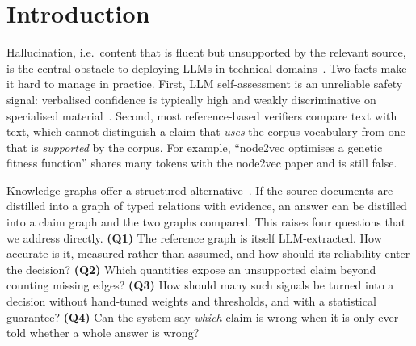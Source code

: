 \documentclass[10pt,twocolumn]{article}
\theoremstyle{remark}
\begin{document}
\section{Introduction}
\label{sec:intro}

Hallucination, i.e.\ content that is fluent but unsupported by the relevant source, is the central obstacle to
deploying LLMs in technical domains~\cite{ji2023survey,huang2025survey}. Two facts make it hard to manage in practice.
First, LLM self-assessment is an unreliable safety signal: verbalised confidence is typically high and weakly
discriminative on specialised material~\cite{xiong2024uncertainty,kadavath2022know}. Second, most reference-based
verifiers compare text with text, which cannot distinguish a claim that \emph{uses} the corpus vocabulary from one that
is \emph{supported} by the corpus. For example, ``node2vec optimises a genetic fitness function'' shares many tokens
with the node2vec paper and is still false.

Knowledge graphs offer a structured alternative~\cite{kim2023factkg,sansford2024grapheval}. If the source documents are
distilled into a graph of typed relations with evidence, an answer can be distilled into a claim graph and the two
graphs compared. This raises four questions that we address directly.
\textbf{(Q1)} The reference graph is itself LLM-extracted. How accurate is it, measured rather than assumed, and how
should its reliability enter the decision? \textbf{(Q2)} Which quantities expose an unsupported claim beyond counting
missing edges? \textbf{(Q3)} How should many such signals be turned into a decision without hand-tuned weights and
thresholds, and with a statistical guarantee? \textbf{(Q4)} Can the system say \emph{which} claim is wrong when it is
only ever told whether a whole answer is wrong?
\end{document}
